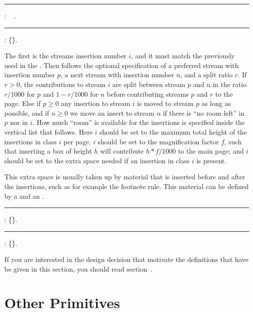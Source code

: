 \medskip
\rule{}:
  \OR\  .
\rule{}:
     \opt{\.{=}}
 \.{\{}\.{\}}.
\medskip


The first  is the streams insertion number $i$,
and it must match the  
previously used in the .
Then follows the optional specification of a preferred stream with insertion number $p$,
a next stream with insertion number $n$, and a split ratio $r$.
If $r>0$, the contributions to stream $i$ are split between
stream $p$ and $n$  in the ratio $r/1000$ for $p$ and $1-r/1000$ for $n$
before contributing streams $p$ and $r$ to the page.
Else if $p\ge0$ any insertion to stream $i$ is moved to stream $p$ as long as possible,
and if $n\ge0$ we move an insert to stream $n$ if there is ``no room left'' in $p$ nor in $i$.
How much ``room'' is available for the insertions is specified inside the vertical list
that follows.
Here $i$ should be set to the maximum total height of the insertions in class $i$ per page. 
$i$ should be set to the magnification factor $f$,
such that inserting a box of height $h$ will contribute $h*f/1000$ to the main page;
and $i$ should be set to the extra space needed if an insertion in class $i$ is present.

This extra space is usually taken up by material that is inserted before and after the insertions,
such as for example the footnote rule. This material can be defined by a 
 and an .

\medskip{}
\rule {}:
   \opt{\.{=}} \.{\{}\.{\}}.
\rule {}:
   \opt{\.{=}} \.{\{}\.{\}}.
\medskip

If you are interested in the design decision that motivate the definitions that have
be given in this section, you should read section~.

\section{Other Primitives}

